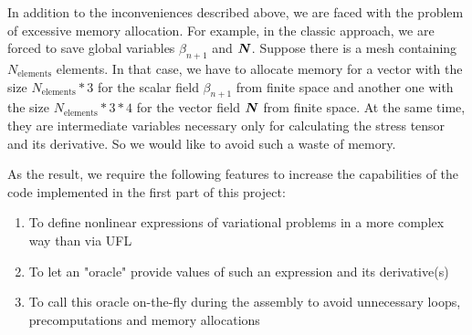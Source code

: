 \documentclass[12pt]{article}
\newcommand{\todounderline}[1]{\todo[inline, size=\scriptsize]{#1}}
\begin{document}

In addition to the inconveniences described above, we are faced with the problem of excessive memory allocation. For example, in the classic approach, we are forced to save global variables $\beta_{n+1}$ and $\mbox{\boldmath $N$}$. Suppose there is a mesh containing $N_\text{elements}$ elements. In that case, we have to allocate memory for a vector with the size $N_\text{elements}*3$ for the scalar field $\beta_{n+1}$ from  finite space and another one with the size $N_\text{elements}*3*4$ for the vector field $\mbox{\boldmath $N$}$ from  finite space. At the same time, they are intermediate variables necessary only for calculating the stress tensor and its derivative. So we would like to avoid such a waste of memory.




As the result, we require the following features to increase the capabilities of the code implemented in the first part of this project:
\begin{enumerate}
    \item To define nonlinear expressions of variational problems in a more complex way than via UFL
    \item To let an "oracle" provide values of such an expression and its derivative(s)
    \item To call this oracle on-the-fly during the assembly to avoid unnecessary loops, precomputations and memory allocations
\end{enumerate}
\end{document}
